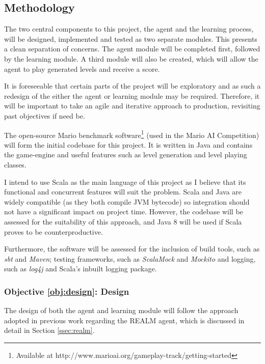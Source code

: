 \subsection{Methodology}

The two central components to this project, the agent and the learning process, will be designed, implemented and tested as two separate modules. This presents a clean separation of concerns. The agent module will be completed first, followed by the learning module. A third module will also be created, which will allow the agent to play generated levels and receive a score.

It is foreseeable that certain parts of the project will be exploratory and as such a redesign of the either the agent or learning module may be required. Therefore, it will be important to take an agile and iterative approach to production, revisiting past objectives if need be.

The open-source Mario benchmark software\footnote{Available at http://www.marioai.org/gameplay-track/getting-started} (used in the Mario AI Competition) will form the initial codebase for this project. It is written in Java and contains the game-engine and useful features such as level generation and level playing classes.

I intend to use Scala as the main language of this project as I believe that its functional and concurrent features will suit the problem. Scala and Java are widely compatible (as they both compile JVM bytecode) so integration should not have a significant impact on project time. However, the codebase will be assessed for the suitability of this approach, and Java 8 will be used if Scala proves to be counterproductive.

Furthermore, the software will be assessed for the inclusion of build tools, such as \emph{sbt} and \emph{Maven}; testing frameworks, such as \emph{ScalaMock} and \emph{Mockito} and logging, such as \emph{log4j} and Scala's inbuilt logging package.

\subsubsection*{Objective \ref{obj:design}: Design}
\label{meth:design}

The design of both the agent and learning module will follow the approach adopted in previous work regarding the REALM agent, which is discussed in detail in Section \ref{ssec:realm}.

